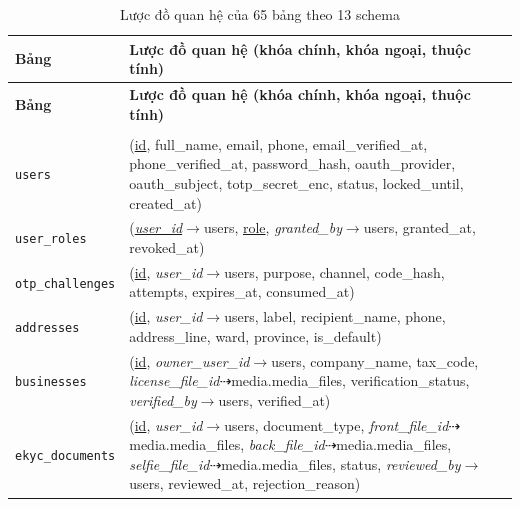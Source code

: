\begingroup
\tblsetup\tblzebra
\begin{longtable}{L{3.10cm} L{11.90cm}}
\caption{Lược đồ quan hệ của 65 bảng theo 13 schema}
\label{tab:luocdoquanhe} \\
\toprule
{}
\textbf{Bảng} & \textbf{Lược đồ quan hệ (khóa chính, khóa ngoại, thuộc tính)} \\
\midrule
\endfirsthead
\toprule
{}
\textbf{Bảng} & \textbf{Lược đồ quan hệ (khóa chính, khóa ngoại, thuộc tính)} \\
\midrule
\endhead
\bottomrule
\endfoot
{}
 \\
\texttt{users} & (\underline{id}, full\_\allowbreak{}name, email, phone, email\_\allowbreak{}verified\_\allowbreak{}at, phone\_\allowbreak{}verified\_\allowbreak{}at, password\_\allowbreak{}hash, oauth\_\allowbreak{}provider, oauth\_\allowbreak{}subject, totp\_\allowbreak{}secret\_\allowbreak{}enc, status, locked\_\allowbreak{}until, created\_\allowbreak{}at) \\
\texttt{user\_\allowbreak{}roles} & (\textit{\underline{user\_\allowbreak{}id}}$\rightarrow$users, \underline{role}, \textit{granted\_\allowbreak{}by}$\rightarrow$users, granted\_\allowbreak{}at, revoked\_\allowbreak{}at) \\
\texttt{otp\_\allowbreak{}challenges} & (\underline{id}, \textit{user\_\allowbreak{}id}$\rightarrow$users, purpose, channel, code\_\allowbreak{}hash, attempts, expires\_\allowbreak{}at, consumed\_\allowbreak{}at) \\
\texttt{addresses} & (\underline{id}, \textit{user\_\allowbreak{}id}$\rightarrow$users, label, recipient\_\allowbreak{}name, phone, address\_\allowbreak{}line, ward, province, is\_\allowbreak{}default) \\
\texttt{businesses} & (\underline{id}, \textit{owner\_\allowbreak{}user\_\allowbreak{}id}$\rightarrow$users, company\_\allowbreak{}name, tax\_\allowbreak{}code, \textit{license\_\allowbreak{}file\_\allowbreak{}id}$\dashrightarrow$media.media\_\allowbreak{}files, verification\_\allowbreak{}status, \textit{verified\_\allowbreak{}by}$\rightarrow$users, verified\_\allowbreak{}at) \\
\texttt{ekyc\_\allowbreak{}documents} & (\underline{id}, \textit{user\_\allowbreak{}id}$\rightarrow$users, document\_\allowbreak{}type, \textit{front\_\allowbreak{}file\_\allowbreak{}id}$\dashrightarrow$media.media\_\allowbreak{}files, \textit{back\_\allowbreak{}file\_\allowbreak{}id}$\dashrightarrow$media.media\_\allowbreak{}files, \textit{selfie\_\allowbreak{}file\_\allowbreak{}id}$\dashrightarrow$media.media\_\allowbreak{}files, status, \textit{reviewed\_\allowbreak{}by}$\rightarrow$users, reviewed\_\allowbreak{}at, rejection\_\allowbreak{}reason) \\

\end{longtable}
